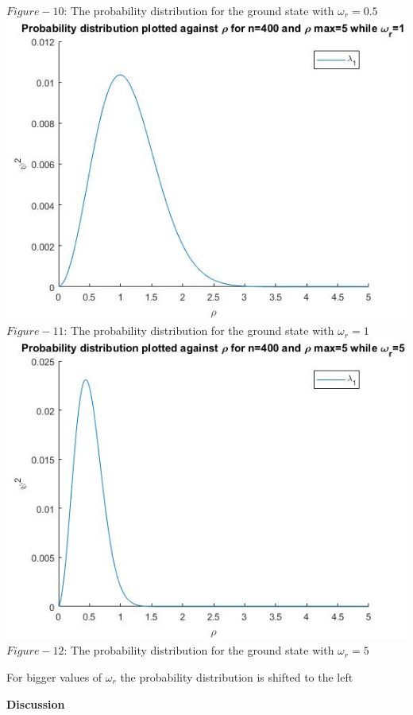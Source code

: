 \documentclass[10pt,a4paper]{article}
\begin{document}
\begin{center}
$Figure-10$: The probability distribution for the ground state with $\omega_r=0.5$
\includegraphics[scale=0.6]{eigomg11.jpg}
$Figure-11$: The probability distribution for the ground state with $\omega_r=1$
\includegraphics[scale=0.6]{eigomg55.jpg}
$Figure-12$: The probability distribution for the ground state with $\omega_r=5$
\end{center}
For bigger values of $\omega_r$ the probability distribution is shifted to the left
\newpage

\begin{center}
{\LARGE\bf Discussion}
\end{center}
\end{document}
